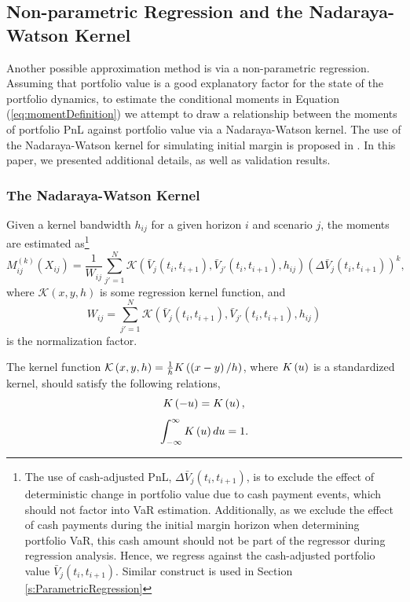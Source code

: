\documentclass[preprint,12pt]{elsarticle}
\begin{document}
\subsection{Non-parametric Regression and the Nadaraya-Watson Kernel}\label{s:NadarayaWatsonRegression}
Another possible approximation method is via a non-parametric regression. Assuming that portfolio value is a good explanatory factor for the state of the portfolio dynamics, to estimate the conditional moments in Equation (\ref{eq:momentDefinition}) we attempt to draw a relationship between the moments of portfolio PnL against portfolio value via a Nadaraya-Watson kernel. The use of the Nadaraya-Watson kernel for simulating initial margin is proposed in \cite{andersen2016rethinking}. In this paper, we presented additional details, as well as validation results.

\subsubsection{The Nadaraya-Watson Kernel}
Given a kernel bandwidth $h_{ij}$ for a given horizon $i$ and scenario $j$, the moments are estimated as\footnote{The use of cash-adjusted PnL, $\Delta\bar{V}_{j}(t_{i},t_{i+1})$, is to exclude the effect of deterministic change in portfolio value due to cash payment events, which should not factor into VaR estimation. Additionally, as we exclude the effect of cash payments during the initial margin horizon when determining portfolio VaR, this cash amount should not be part of the regressor during regression analysis. Hence, we regress against the cash-adjusted portfolio value $\bar{V}_{j}(t_{i},t_{i+1})$. Similar construct is used in Section \ref{s:ParametricRegression}} 
\begin{equation}\label{eq:NadarayaWatsonMoments}
M_{ij}^{(k)}(X_{ij})=\frac{1}{W_{ij}}\sum_{j'=1}^{N}\mathcal{K}\left(\bar{V}_{j}(t_{i},t_{i+1}),\bar{V}_{j'}(t_{i},t_{i+1}),h_{ij}\right)\left(\Delta\bar{V}_{j}(t_{i},t_{i+1})\right)^{k},
\end{equation}
where $\mathcal{K}\left(x,y,h\right)$ is some regression kernel function, and
\begin{equation}
W_{ij}=\sum_{j'=1}^{N}\mathcal{K}\left(\bar{V}_{j}(t_{i},t_{i+1}),\bar{V}_{j'}(t_{i},t_{i+1}),h_{ij}\right)
\end{equation}
is the normalization factor. 

The kernel function $\mathcal{K}\left(x,y,h\right)=\frac{1}{h}\boldmath{K}\left(\left(x-y\right)/h\right)$, where $\boldmath{K}\left(u\right)$ is a standardized kernel, should satisfy the following relations,
\begin{equation}
\boldmath{K}\left(-u\right)= \boldmath{K}\left(u\right),
\end{equation}
\begin{equation}
\int_{-\infty}^{\infty}\boldmath{K}\left(u\right)du = 1.
\end{equation}
\end{document}
